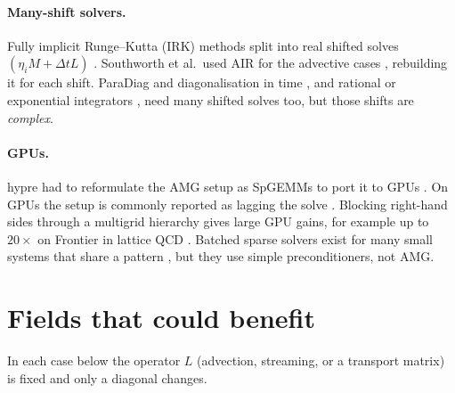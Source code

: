 \documentclass[11pt,a4paper]{article}
\begin{document}
\paragraph{Many-shift solvers.} Fully implicit Runge--Kutta (IRK) methods split into real shifted solves $(\eta_i M+\Delta t L)$ \cite{SKPD22,PP17,SMN06,RHLMM21}. Southworth et al.\ used AIR for the advective cases \cite{SKPD22}, rebuilding it for each shift. ParaDiag and diagonalisation in time \cite{MR08,ParaDiag,MPW18}, and rational or exponential integrators \cite{GG13,Guettel13,TWS06}, need many shifted solves too, but those shifts are \emph{complex}.

\paragraph{GPUs.} hypre had to reformulate the AMG setup as SpGEMMs to port it to GPUs \cite{FLSWY21,LSY21}. On GPUs the setup is commonly reported as lagging the solve \cite{LSY21,Darg26}. Blocking right-hand sides through a multigrid hierarchy gives large GPU gains, for example up to $20\times$ on Frontier in lattice QCD \cite{Boyle24,XAMG21}. Batched sparse solvers exist for many small systems that share a pattern \cite{KashiIPDPS22}, but they use simple preconditioners, not AMG.

\section{Fields that could benefit}
In each case below the operator $L$ (advection, streaming, or a transport matrix) is fixed and only a diagonal changes.
\end{document}
